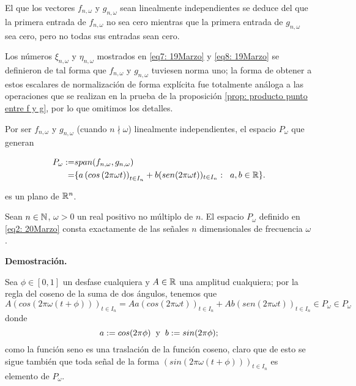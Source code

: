 El que los
vectores $f_{n, \omega}$ y $g_{n, \omega}$ sean 
linealmente independientes
se deduce del que la primera entrada de $f_{n, \omega}$ no sea cero
mientras que la primera entrada de $g_{n, \omega}$ sea cero, pero no
todas sus entradas sean cero. 

Los números $\xi_{n, \omega}$ y $\eta_{n, \omega}$
mostrados en \eqref{eq7: 19Marzo} y \eqref{eq8: 19Marzo}
se definieron de tal forma que $f_{n, \omega}$ y $g_{n, \omega}$ tuviesen norma uno;
la forma de obtener a estos escalares de normalización de forma explícita fue
totalmente análoga a las operaciones que se realizan en la prueba de la proposición
\ref{prop: producto punto entre f y g}, por lo que omitimos los detalles.
\QEDB
\vspace{0.2cm}


Por ser $f_{n, \omega}$ y $g_{n, \omega}$ (cuando $n \nmid \omega$)
linealmente independientes, el espacio $P_{\omega}$ que generan

\begin{align}
\label{eq2: 20Marzo}
P_{\omega}:= & span(f_{n, \omega}, g_{n, \omega}) \notag  \\  
= &
\{ a \left( cos \left(2 \pi \omega t \right) \right)_{t \in I_{n}} +
b ( sen (2 \pi \omega t ))_{t \in I_{n}} : 
\hspace{0.2cm} a, b \in \mathbb{R} \}. 
\end{align}

\noindent
es un plano  de $\mathbb{R}^{n}$.

\begin{prop}
\label{prop: Pw consta de las señales de frecuencia omega}
Sean $n \in \mathbb{N}$, $\omega>0$ un real positivo no múltiplo
de $n$. El espacio $P_{\omega}$ definido en \eqref{eq2: 20Marzo} consta exactamente
de las señales $n$ dimensionales de frecuencia $\omega$.
\end{prop}

\noindent
\textbf{Demostración.}

Sea $\phi \in [0,1]$ un desfase cualquiera y $A \in \mathbb{R}$
una amplitud cualquiera; por la regla
del coseno de la suma de dos ángulos, tenemos que
\[
A(cos (2 \pi \omega (t + \phi)))_{t \in I_{n}}
= Aa  (cos(2 \pi \omega t))_{t \in I_{n}} +
Ab  (sen(2 \pi \omega t))_{t \in I_{n}} \in P_{\omega} \in P_{\omega}
\]
donde
\[
a := cos (2 \pi \phi) \hspace{0.2cm} \text{y}
\hspace{0.2cm} b := sin (2 \pi  \phi);
\]
como la función seno es una traslación de la función coseno,
claro que de esto se sigue también que toda señal de la forma 
$(sin (2 \pi \omega (t + \phi)))_{t \in I_{n}}$ es elemento de
$P_{\omega}$.

